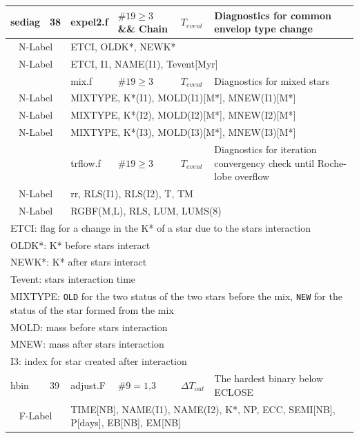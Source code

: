 \begin{longtable}{||p{0.42in}|p{0.25in}|p{0.6in}|p{0.6in}|p{0.4in}|p{2.3in}||}
 sediag     & 38  & expel2.f   & $\#19\geq3$ \&\& Chain  & $T_{event}$ & Diagnostics for common envelop type change \\\hline
\multicolumn{2}{|c|}{ N-Label } &   \multicolumn{4}{|p{4.4in}|}{ETCI, OLDK*, NEWK*} \\\hline
\multicolumn{2}{|c|}{ N-Label } &   \multicolumn{4}{|p{4.4in}|}{ETCI, I1, NAME(I1), Tevent[Myr] }
\\\hline
           &     & mix.f      & $\#19\geq3$ & $T_{event}$ & Diagnostics for mixed stars 
           \\\hline
\multicolumn{2}{|c|}{ N-Label } & \multicolumn{4}{|p{4.4in}|}{MIXTYPE, K*(I1), MOLD(I1)[M*], MNEW(I1)[M*]  }\\\hline
\multicolumn{2}{|c|}{ N-Label } & \multicolumn{4}{|p{4.4in}|}{MIXTYPE, K*(I2), MOLD(I2)[M*], MNEW(I2)[M*]  } \\\hline
\multicolumn{2}{|c|}{ N-Label } & \multicolumn{4}{|p{4.4in}|}{MIXTYPE, K*(I3), MOLD(I3)[M*], MNEW(I3)[M*]  }
\\\hline
           &     & trflow.f   & $\#19\geq3$ & $T_{event}$ &  Diagnostics for iteration convergency check until Roche-lobe overflow \\\hline
\multicolumn{2}{|c|}{ N-Label } & \multicolumn{4}{|p{4.4in}|}{rr, RLS(I1), RLS(I2), T, TM}\\\hline
\multicolumn{2}{|c|}{ N-Label } & \multicolumn{4}{|p{4.4in}|}{RGBF(M,L), RLS, LUM, LUMS(8)}\\\hline
\multicolumn{6}{|p{5.4in}|}{ ETCI: flag for a change in the K* of a star due to the stars interaction}\\
\multicolumn{6}{|p{5.4in}|}{OLDK*: K* before stars interact} \\
\multicolumn{6}{|p{5.4in}|}{NEWK*: K* after stars interact} \\
\multicolumn{6}{|p{5.4in}|}{Tevent: stars interaction time} \\
\multicolumn{6}{|p{5.4in}|}{MIXTYPE: \texttt{OLD} for the two status of the two stars before the mix, \texttt{NEW} for the status of the star formed from the mix}\\
\multicolumn{6}{|p{5.4in}|}{MOLD: mass before stars interaction} \\
\multicolumn{6}{|p{5.4in}|}{MNEW: mass after stars interaction} \\
\multicolumn{6}{|p{5.4in}|}{I3: index for star created after interaction} \\
\hline\hline

  hbin     & 39  & adjust.F   & $\#9=1$,3  & $\Delta T_{out}$      & The hardest binary below ECLOSE \\\hline
\multicolumn{2}{|c|}{ F-Label } & \multicolumn{4}{|p{4.4in}|}{ TIME[NB], NAME(I1), NAME(I2), K*, NP, ECC, SEMI[NB], P[days], EB[NB], EM[NB]} \\\hline\hline


\end{longtable}
